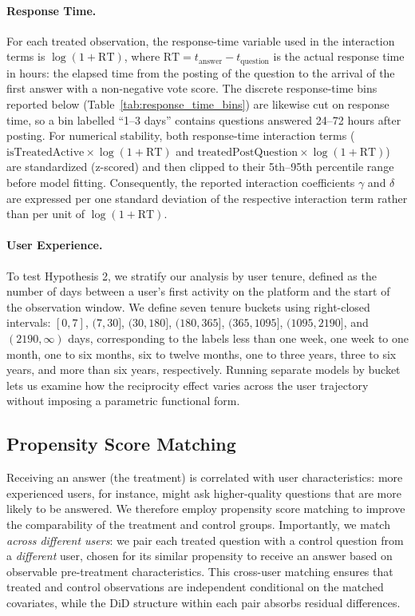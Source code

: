 \paragraph{Response Time.} For each treated observation, the response-time variable used in the interaction terms is $\log(1 + \text{RT})$, where $\text{RT} = t_{\text{answer}} - t_{\text{question}}$ is the actual response time in hours: the elapsed time from the posting of the question to the arrival of the first answer with a non-negative vote score. The discrete response-time bins reported below (Table~\ref{tab:response_time_bins}) are likewise cut on response time, so a bin labelled ``1--3 days'' contains questions answered 24--72 hours after posting. For numerical stability, both response-time interaction terms ($\text{isTreatedActive} \times \log(1+\text{RT})$ and $\text{treatedPostQuestion} \times \log(1+\text{RT})$) are standardized (z-scored) and then clipped to their 5th--95th percentile range before model fitting. Consequently, the reported interaction coefficients $\gamma$ and $\delta$ are expressed per one standard deviation of the respective interaction term rather than per unit of $\log(1+\text{RT})$.

\paragraph{User Experience.} To test Hypothesis 2, we stratify our analysis by user tenure, defined as the number of days between a user's first activity on the platform and the start of the observation window. We define seven tenure buckets using right-closed intervals: $[0, 7]$, $(7, 30]$, $(30, 180]$, $(180, 365]$, $(365, 1095]$, $(1095, 2190]$, and $(2190, \infty)$ days, corresponding to the labels less than one week, one week to one month, one to six months, six to twelve months, one to three years, three to six years, and more than six years, respectively. Running separate models by bucket lets us examine how the reciprocity effect varies across the user trajectory without imposing a parametric functional form. 

\subsection{Propensity Score Matching}
\label{sec:matching}

Receiving an answer (the treatment) is correlated with user characteristics: more experienced users, for instance, might ask higher-quality questions that are more likely to be answered. We therefore employ propensity score matching \citep{rosenbaum_rubin_1983} to improve the comparability of the treatment and control groups. Importantly, we match \textit{across different users}: we pair each treated question with a control question from a \emph{different} user, chosen for its similar propensity to receive an answer based on observable pre-treatment characteristics. This cross-user matching ensures that treated and control observations are independent conditional on the matched covariates,
while the DiD structure within each pair absorbs residual differences.

